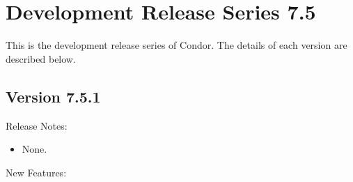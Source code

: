 
\section{\label{sec:History-7-5}Development Release Series 7.5}

This is the development release series of Condor.
The details of each version are described below.

\subsection*{\label{sec:New-7-5-1}Version 7.5.1}

\noindent Release Notes:

\begin{itemize}

\item None.

\end{itemize}


\noindent New Features:

